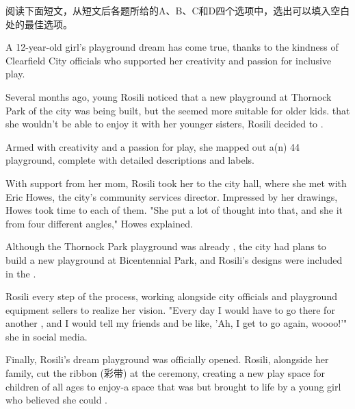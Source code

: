 \documentclass{英语试卷}
\begin{document}
\par 阅读下面短文，从短文后各题所给的A、B、C和D四个选项中，选出可以填入空白处的最佳选项。\par
\par A 12-year-old girl's playground dream has come true, thanks to the kindness of Clearfield City officials who supported her creativity and passion for inclusive play.\par
\par Several months ago, young Rosili noticed that a new playground at Thornock Park of the city was being built, but the  seemed more suitable for older kids.  that she wouldn't be able to enjoy it with her younger sisters, Rosili decided to .\par
\par Armed with creativity and a passion for play, she mapped out a(n) \blanknum{} 44\blanknum{} playground, complete with detailed descriptions and labels.\par
\par With support from her mom, Rosili took her  to the city hall, where she met with Eric Howes, the city's community services director. Impressed by her drawings, Howes took time to  each of them. "She put a lot of thought into that, and she  it from four different angles," Howes explained.\par
\par Although the Thornock Park playground was already , the city had plans to build a new playground at Bicentennial Park, and Rosili's designs were included in the .\par
\par Rosili  every step of the process, working alongside city officials and playground equipment sellers to realize her vision. "Every day I would have to go there for another , and I would tell my friends and be like, 'Ah, I get to go again, woooo!'" she  in social media.\par
\par Finally, Rosili's dream playground was officially opened. Rosili, alongside her family,  cut the ribbon (彩带) at the ceremony, creating a new play space for children of all ages to enjoy-a space that was  but brought to life by a young girl who believed she could .\par
\end{document}
